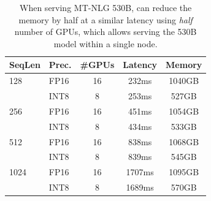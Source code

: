 \begin{table}[h]
    \setlength{\tabcolsep}{7pt}
    \small
    \centering
    \caption{When serving MT-NLG 530B, \method can reduce the memory by half at a similar latency using \emph{half} number of GPUs, which allows serving the 530B model within a single node.}
    \begin{tabular}{llccc}
        \toprule
    {SeqLen} & {Prec.} & {\#GPUs}&  {Latency} & {Memory}  \\
         \midrule 
         128 & FP16 & 16 & 232ms & 1040GB   \\
             & INT8 & 8 & 253ms & 527GB \\ \midrule
         256 &  FP16 & 16 & 451ms & 1054GB  \\
             &  INT8 & 8 & 434ms & 533GB \\ \midrule
         512 &  FP16 & 16 & 838ms & 1068GB  \\
             &  INT8 & 8  & 839ms & 545GB \\ \midrule
        1024 &  FP16 & 16 & 1707ms & 1095GB \\
             &  INT8 & 8  & 1689ms & 570GB \\
        \bottomrule
    \end{tabular}
    \label{tab:530b_latency}
\end{table}

